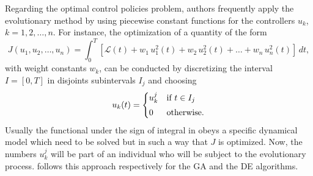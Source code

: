   Regarding the optimal control policies problem, authors frequently apply the 
evolutionary method by using piecewise constant functions for the controllers 
$u_k$, $k=1,2,\dots,n$. For instance, the optimization of a
quantity of the form
\begin{equation}
  J(u_1,u_2,\dots,u_n) = \int_0^T{\left[ \mathcal{L}(t) + w_1\,u_1^2(t) + 
  w_2\,u_2^2(t)+\dots + w_n\,u_n^2(t) \right]\,dt},
\label{eq:Jaccion}
\end{equation}
with weight constants $w_k$, can be conducted by discretizing the 
interval $I = [0,T]$ in disjoints subintervals $I_j$ and choosing  
\begin{equation}\label{DECrossover}
  u_{k}(t) =
  \begin{cases}
    u^j_{k} & \text{if $t \in I_j$}
      \vspace*{0.1cm}\\
      0 & \text{otherwise.}
  \end{cases}
\end{equation}
  Usually the functional under the sign of integral in 
obeys a specific dynamical model which need to be solved but in such a way
that $J$ is optimized. Now, the numbers $u^j_{k}$ will be part of an 
individual who will be subject to the evolutionary process. 
\citet{Yan2008,Jang2018} follows this approach respectively for the GA and the 
DE algorithms.